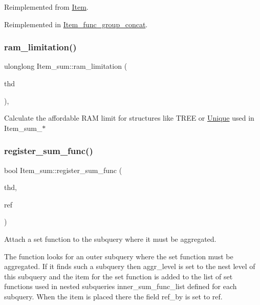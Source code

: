 Reimplemented from \mbox{\hyperlink{classItem_aa7ba4bde739d83adec8edf3bf1596d94}{Item}}.



Reimplemented in \mbox{\hyperlink{classItem__func__group__concat_aec51f14b9c22c61d5ac4e58add30365b}{Item\+\_\+func\+\_\+group\+\_\+concat}}.

\mbox{\label{classItem__sum_ad70361f29a92bb55dccd236ddd5e9a53}} 
\subsubsection{\texorpdfstring{ram\+\_\+limitation()}{ram\_limitation()}}
{\footnotesize\ttfamily ulonglong Item\+\_\+sum\+::ram\+\_\+limitation (\begin{DoxyParamCaption}\item[{T\+HD $\ast$}]{thd }\end{DoxyParamCaption})\hspace{0.3cm}{\ttfamily [static]}, {\ttfamily [protected]}}

Calculate the affordable R\+AM limit for structures like T\+R\+EE or \mbox{\hyperlink{classUnique}{Unique}} used in Item\+\_\+sum\+\_\+$\ast$ \mbox{\label{classItem__sum_a15a75b6a683912f8222f7091b3714ec8}} 
\subsubsection{\texorpdfstring{register\+\_\+sum\+\_\+func()}{register\_sum\_func()}}
{\footnotesize\ttfamily bool Item\+\_\+sum\+::register\+\_\+sum\+\_\+func (\begin{DoxyParamCaption}\item[{T\+HD $\ast$}]{thd,  }\item[{\mbox{\hyperlink{classItem}{Item}} $\ast$$\ast$}]{ref }\end{DoxyParamCaption})}

Attach a set function to the subquery where it must be aggregated.

The function looks for an outer subquery where the set function must be aggregated. If it finds such a subquery then aggr\+\_\+level is set to the nest level of this subquery and the item for the set function is added to the list of set functions used in nested subqueries inner\+\_\+sum\+\_\+func\+\_\+list defined for each subquery. When the item is placed there the field \textquotesingle{}ref\+\_\+by\textquotesingle{} is set to ref.

